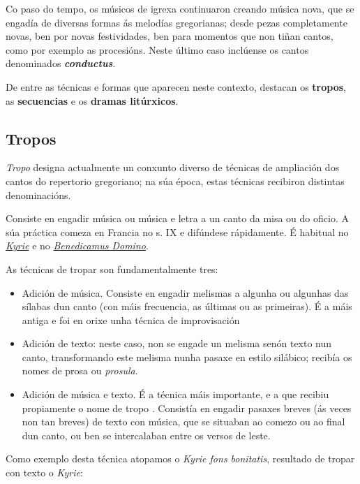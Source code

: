 \documentclass[a4paper, twoside]{templates/ociamthesis}
\begin{document}
Co paso do tempo, os músicos de igrexa continuaron creando música nova, que se engadía de diversas formas ás melodías gregorianas; desde pezas completamente novas, ben por novas festividades, ben para momentos que non tiñan cantos, como por exemplo as procesións. Neste último caso inclúense os cantos denominados \textbf{\emph{conductus}}.

De entre as técnicas e formas que aparecen neste contexto, destacan os \textbf{tropos}, as \textbf{secuencias} e os \textbf{dramas litúrxicos}.

\hypertarget{tropos}{%
\subsection{Tropos}\label{tropos}}

\emph{Tropo} designa actualmente un conxunto diverso de técnicas de ampliación dos cantos do repertorio gregoriano; na súa época, estas técnicas recibiron distintas denominacións.

Consiste en engadir música ou música e letra a un canto da misa ou do oficio. A súa práctica comeza en Francia no s. IX e difúndese rápidamente. É habitual no \href{https://open.spotify.com/track/0wTT2YyDjlqmjHe1HOIacE}{\emph{Kyrie}} e no \href{https://es.wikipedia.org/wiki/Benedicamus_domino}{\emph{Benedicamus Domino}}.

As técnicas de tropar son fundamentalmente tres:

\begin{itemize}
\item
  Adición de música. Consiste en engadir melismas a algunha ou algunhas das sílabas dun canto (con máis frecuencia, as últimas ou as primeiras). É a máis antiga e foi en orixe unha técnica de improvisación
\item
  Adición de texto: neste caso, non se engade un melisma senón texto nun canto, transformando este melisma nunha pasaxe en estilo silábico; recibía os nomes de prosa ou \emph{prosula}.
\item
  Adición de música e texto. É a técnica máis importante, e a que recibiu propiamente o nome de tropo . Consistía en engadir pasaxes breves (ás veces non tan breves) de texto con música, que se situaban ao comezo ou ao final dun canto, ou ben se intercalaban entre os versos de leste.
\end{itemize}

Como exemplo desta técnica atopamos o \emph{Kyrie fons bonitatis}, resultado de tropar con texto o \emph{Kyrie}:
\end{document}
